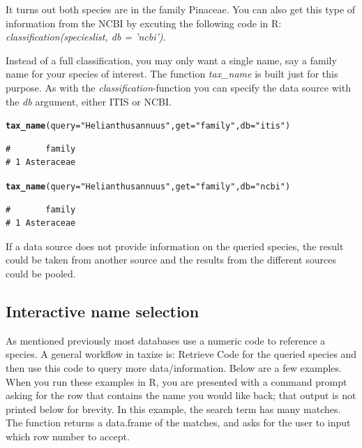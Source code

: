 \documentclass[10pt,a4paper,twocolumn]{article}\usepackage[]{graphicx}\usepackage[]{color}
\makeatletter
\newcommand{\hlstr}[1]{\textcolor[rgb]{0.192,0.494,0.8}{#1}}%
\newcommand{\hlstd}[1]{\textcolor[rgb]{0.345,0.345,0.345}{#1}}%
\newcommand{\hlkwc}[1]{\textcolor[rgb]{0.333,0.667,0.333}{#1}}%
\newcommand{\hlkwd}[1]{\textcolor[rgb]{0.737,0.353,0.396}{\textbf{#1}}}%
\newenvironment{kframe}{%
 \def\at@end@of@kframe{}%
 \ifinner\ifhmode%
  \def\at@end@of@kframe{\end{minipage}}%
  \begin{minipage}{\columnwidth}%
 \fi\fi%
 \def\FrameCommand##1{\hskip\@totalleftmargin \hskip-\fboxsep
 \colorbox{shadecolor}{##1}\hskip-\fboxsep
     \hskip-\linewidth \hskip-\@totalleftmargin \hskip\columnwidth}%
 \MakeFramed {\advance\hsize-\width
   \@totalleftmargin\z@ \linewidth\hsize
   \@setminipage}}%
 {\par\unskip\endMakeFramed%
 \at@end@of@kframe}
\newenvironment{knitrout}{}{} %
\makeatother
\begin{document}
It turns out both species are in the family Pinaceae. You can also get this type of information from the NCBI by excuting the following code in R: \emph{classification(specieslist, db = 'ncbi')}.

Instead of a full classification, you may only want a single name, say a family name for your species of interest. The function \emph{tax\_name} is built just for this purpose. As with the \emph{classification}-function you can specify the data source with the \emph{db} argument, either ITIS or NCBI. 

\begin{knitrout}\scriptsize
{}\color{fgcolor}\begin{kframe}
\begin{alltt}
\hlkwd{tax_name}\hlstd{(}\hlkwc{query} \hlstd{=} \hlstr{"Helianthus annuus"}\hlstd{,} \hlkwc{get} \hlstd{=} \hlstr{"family"}\hlstd{,} \hlkwc{db} \hlstd{=} \hlstr{"itis"}\hlstd{)}
\end{alltt}
\begin{verbatim}
#       family
# 1 Asteraceae
\end{verbatim}
\begin{alltt}
\hlkwd{tax_name}\hlstd{(}\hlkwc{query} \hlstd{=} \hlstr{"Helianthus annuus"}\hlstd{,} \hlkwc{get} \hlstd{=} \hlstr{"family"}\hlstd{,} \hlkwc{db} \hlstd{=} \hlstr{"ncbi"}\hlstd{)}
\end{alltt}
\begin{verbatim}
#       family
# 1 Asteraceae
\end{verbatim}
\end{kframe}
\end{knitrout}


If a data source does not provide information on the queried species, the result could be taken from another source and the results from the different sources could be pooled.

\subsection*{Interactive name selection}
As mentioned previously most databases use a numeric code to reference a species. A general workflow in taxize is: Retrieve Code for the queried species and then use this code to query more data/information. Below are a few examples. When you run these examples in R, you are presented with a command prompt asking for the row that contains the name you would like back; that output is not printed below for brevity. In this example, the search term has many matches. The function returns a data.frame of the matches, and asks for the user to input which row number to accept. 
\end{document}
